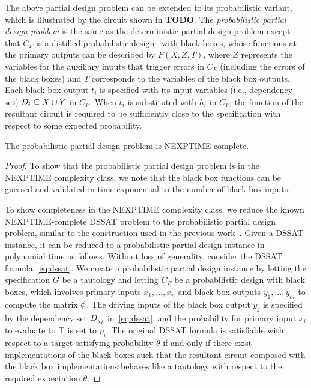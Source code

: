 The above partial design problem can be extended to its probabilistic variant,
which is illustrated by the circuit shown in \textbf{TODO}.
The \textit{probabilistic partial design problem} is the same as the deterministic partial design problem except that
$C_F$ is a distilled probabilistic design~\cite{LeeTC18ProbDesign} with black boxes,
whose functions at the primary outputs can be described by $F(X,Z,T)$,
where $Z$ represents the variables for the auxiliary inputs that trigger errors in $C_F$
(including the errors of the black boxes) and
$T$ corresponds to the variables of the black box outputs.
Each black box output $t_i$ is specified with its input variables (i.e., dependency set)
$D_{i} \subseteq X \cup Y$ in $C_F$.
When $t_i$ is substituted with $h_i$ in $C_F$,
the function of the resultant circuit is required to be sufficiently close to the specification with respect to some expected probability.

\begin{theorem}
    The probabilistic partial design problem is NEXPTIME-complete.
\end{theorem}
\begin{proof}
    To show that the probabilistic partial design problem is in the NEXPTIME complexity class,
    we note that the black box functions can be guessed and validated in time exponential to the number of black box inputs.

    To show completeness in the NEXPTIME complexity class,
    we reduce the known NEXPTIME-complete DSSAT problem to the probabilistic partial design problem,
    similar to the construction used in the previous work~\cite{Gitina2013}.
    Given a DSSAT instance,
    it can be reduced to a probabilistic partial design instance in polynomial time as follows.
    Without loss of generality,
    consider the DSSAT formula~\cref{eq:dssat}.
    We create a probabilistic partial design instance by letting the specification $G$ be a tautology and
    letting $C_F$ be a probabilistic design with black boxes,
    which involves primary inputs $x_1,\ldots,x_n$ and black box outputs $y_1,\ldots,y_m$ to compute the matrix $\phi$.
    The driving inputs of the black box output $y_j$ is specified by the dependency set $D_{y_j}$ in~\cref{eq:dssat},
    and the probability for primary input $x_i$ to evaluate to $\top$ is set to $p_i$.
    The original DSSAT formula is satisfiable with respect to a target satisfying probability $\theta$ if and only if
    there exist implementations of the black boxes such that the resultant circuit composed with the black box implementations behaves like a tautology with respect to the required expectation $\theta$.
\end{proof}

